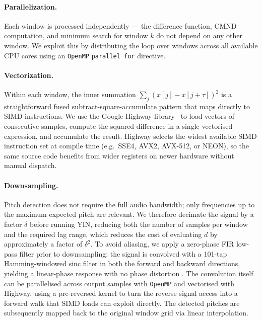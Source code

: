 \documentclass[sigconf]{acmart}
\begin{document}
    \paragraph{Parallelization.} Each window is processed independently — the difference function, CMND computation, and minimum search for window $k$ do not depend on any other window.
    We exploit this by distributing the loop over windows across all available CPU cores using an \texttt{OpenMP} \texttt{parallel for} directive.

    \paragraph{Vectorization.} Within each window, the inner summation $\sum_j (x[j] - x[j+\tau])^2$ is a straightforward fused subtract-square-accumulate pattern that maps directly to SIMD instructions.
    We use the Google Highway library~\cite{highway} to load vectors of consecutive samples, compute the squared difference in a single vectorised expression, and accumulate the result.
    Highway selects the widest available SIMD instruction set at compile time (e.g.\ SSE4, AVX2, AVX-512, or NEON), so the same source code benefits from wider registers on newer hardware without manual dispatch.

    \paragraph{Downsampling.} Pitch detection does not require the full audio bandwidth; only frequencies up to the maximum expected pitch are relevant.
    We therefore decimate the signal by a factor $\delta$ before running YIN, reducing both the number of samples per window and the required lag range, which reduces the cost of evaluating $d$ by approximately a factor of $\delta^2$.
    To avoid aliasing, we apply a zero-phase FIR low-pass filter prior to downsampling: the signal is convolved with a 101-tap Hamming-windowed sinc filter in both the forward and backward directions, yielding a linear-phase response with no phase distortion \cite{lyons_dsp,oppenheim_dsp}.
    The convolution itself can be parallelised across output samples with \texttt{OpenMP} and vectorised with Highway, using a pre-reversed kernel to turn the reverse signal access into a forward walk that SIMD loads can exploit directly.
    The detected pitches are subsequently mapped back to the original window grid via linear interpolation.

\end{document}
